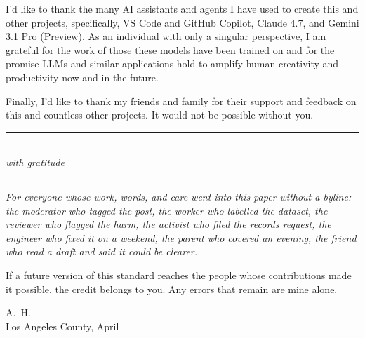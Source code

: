 \documentclass[10pt,a4paper,twocolumn]{article}
\begin{document}
I'd like to thank the many AI assistants and agents I have used to create this and other projects, specifically, VS Code and GitHub Copilot, Claude 4.7, and Gemini 3.1 Pro (Preview). As an individual with only a singular perspective, I am grateful for the work of those these models have been trained on and for the promise LLMs and similar applications hold to amplify human creativity and productivity now and in the future.

Finally, I'd like to thank my friends and family for their support and feedback on this and countless other projects. It would not be possible without you.

\vspace{0.8em}

\begin{center}
\rule{0.25\textwidth}{0.4pt}\\[4pt]
{\itshape with gratitude}\\[4pt]
\rule{0.25\textwidth}{0.4pt}
\end{center}

\vspace{0.4em}

\begin{center}
\begin{minipage}{0.78\textwidth}
\footnotesize\itshape\noindent
For everyone whose work, words, and care went into this paper without a byline: the moderator who tagged the post, the worker who labelled the dataset, the reviewer who flagged the harm, the activist who filed the records request, the engineer who fixed it on a weekend, the parent who covered an evening, the friend who read a draft and said it could be clearer.

If a future version of this standard reaches the people whose contributions made it possible, the credit belongs to you. Any errors that remain are mine alone.

\smallskip
\centering
\upshape
A.~H. \\
Los Angeles County, April \the\year
\end{minipage}
\end{center}

\vspace{0.2em}

\begin{center}
\end{center}
\end{document}
